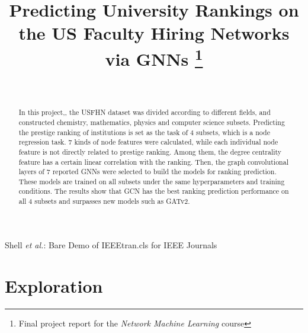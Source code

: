 \documentclass[journal]{IEEEtran}
\begin{document}
\title{Predicting University Rankings on the US Faculty Hiring Networks via GNNs
\thanks{Final project report for the \textit{Network Machine Learning} course}
}

\author{ \\
}

%
{Shell \MakeLowercase{\textit{et al.}}: Bare Demo of IEEEtran.cls for IEEE Journals}

\maketitle

\begin{abstract}
In this project,, the USFHN dataset was divided according to different fields, and constructed chemistry, mathematics, physics and computer science subsets. Predicting the prestige ranking of institutions is set as the task of 4 subsets, which is a node regression task. 7 kinds of node features were calculated, while each individual node feature is not directly related to prestige ranking. Among them, the degree centrality feature has a certain linear correlation with the ranking. Then, the graph convolutional layers of 7 reported GNNs were selected to build the models for ranking prediction. These models are trained on all subsets under the same hyperparameters and training conditions. The results show that GCN has the best ranking prediction performance on all 4 subsets and surpasses new models such as GATv2.
\end{abstract}

\section{Exploration}
\end{document}
